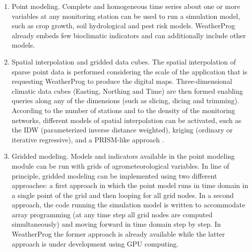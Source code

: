 \documentclass[authoryear,preprint,review,12pt]{elsarticle}
\begin{document}
\begin{enumerate}
    \item Point modeling. Complete and homogeneous time series about one or more variables at any monitoring station can be used to run a simulation model, such as crop growth, soil hydrological and pest risk models.
    WeatherProg already embeds few bioclimatic indicators and can additionally include other models.
    
    \item Spatial interpolation and gridded data cubes. The spatial interpolation of sparse point data is performed considering the scale of the application that is requesting WeatherProg to produce the digital maps.
    Three-dimensional climatic data cubes (Easting, Northing and Time) are then formed enabling queries along any of the dimensions (such as slicing, dicing and trimming).
    According to the number of stations and to the density of the monitoring networks, different models of spatial interpolation can be activated, such as the IDW (parameterized inverse distance weighted), kriging (ordinary or iterative regressive), and a PRISM-like approach \citep{Daly08_PRISM_USA}.
    \item Gridded modeling. Models and indicators available in the point modeling module can be run with grids of agrometeorological variables.
    In line of principle, gridded modeling can be implemented using two different approaches: a first approach in which the point model runs in time domain in a single point of the grid and then looping for all grid nodes.
    In a second approach, the code running the simulation model is written to accommodate array programming (at any time step all grid nodes are computed simultaneously) and moving forward in time domain step by step.
    In WeatherProg the former approach is already available while the latter approach is under development using GPU computing.
    
\end{enumerate}
\end{document}
